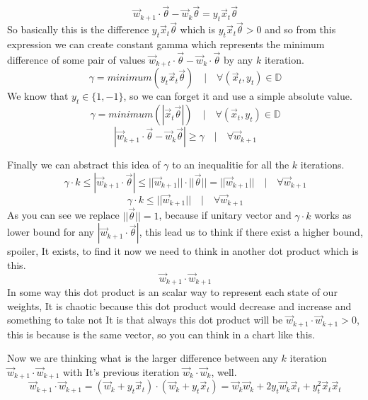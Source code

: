 \[
  \vec{w}_{k + 1} \cdot \vec{\theta} -  \vec{w}_{k}\vec{\theta}
  =  y_t\vec{x}_t\vec{\theta}
\]
So basically this is
the difference $y_t\vec{x}_t\vec{\theta}$ which is $y_t\vec{x}_t\vec{\theta} > 0$ and so
from this expression we can create constant gamma which represents the minimum
difference of some pair of values $\vec{w}_{k+t} \cdot \vec{\theta} - \vec{w}_{k} \cdot \vec{\theta}$
by any $k$ iteration.
\[
  \gamma = minimum(y_t \vec{x}_t\vec{\theta}) \quad|\quad \forall (\vec{x}_t, y_t) \in \mathbb{D}
\]
We know that $y_t \in \{1, -1\}$, so we can forget it and use a simple absolute value.
\[
  \gamma = minimum(|\vec{x}_t\vec{\theta}|) \quad|\quad \forall (\vec{x}_t, y_t) \in \mathbb{D}
\]
\[
  |\vec{w}_{k + 1} \cdot \vec{\theta} -  \vec{w}_{k}\vec{\theta}|
  \ge \gamma\quad | \quad \forall \vec{w}_{k+1}
\]

Finally we can abstract this idea of $\gamma$ to an inequalitie for all the $k$ iterations.
\[
  \gamma \cdot k \le |\vec{w}_{k+1} \cdot \vec{\theta}| \le ||\vec{w}_{k+1}||\cdot ||\vec{\theta}||
  = ||\vec{w}_{k+1}||\quad|\quad \forall \vec{w}_{k + 1}
\]
\[
  \gamma \cdot k \le ||\vec{w}_{k+1}||\quad|\quad \forall \vec{w}_{k + 1}
\]
As you can see we replace $||\vec{\theta}|| = 1$, because if unitary vector and
$\gamma \cdot k$ works as lower bound for any $|\vec{w}_{k + 1}\cdot \vec{\theta} |$, this lead us
to think if there exist a higher bound, spoiler, It exists, to find it now we need to think in another
dot product which is this.
\[
  \vec{w}_{k + 1} \cdot \vec{w}_{k+1}
\]
In some way this dot product is an scalar way to represent each state of our weights, It is chaotic
because this dot product would decrease and increase and something to take not It is that
always this dot product will be
$\vec{w}_{k + 1} \cdot \vec{w}_{k+1} > 0$, this is because is the same vector,
so you can think in a chart like this.
\begin{center}
\end{center}
Now we are thinking
what is the larger difference between
any $k$ iteration $\vec{w}_{k+1} \cdot \vec{w}_{k+1}$ with It's
previous iteration $\vec{w}_{k} \cdot \vec{w}_{k}$, well.
\[
  \vec{w}_{k + 1} \cdot \vec{w}_{k + 1} = (\vec{w}_{k} + y_t\vec{x}_t) \cdot (\vec{w}_{k} + y_t\vec{x}_t)
  = \vec{w}_k\vec{w}_k + 2y_t\vec{w}_k\vec{x}_t + y_t^2\vec{x}_t\vec{x}_t
\]

